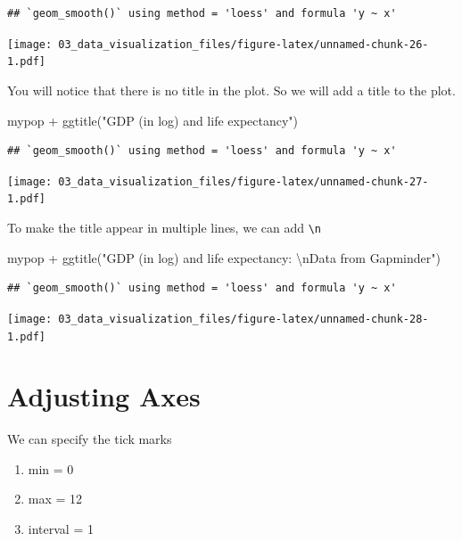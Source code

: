 \documentclass[
  10pt,
]{krantz}
\newenvironment{Shaded}{\begin{snugshade}}{\end{snugshade}}
\newcommand{\FunctionTok}[1]{\textcolor[rgb]{0.00,0.00,0.00}{#1}}
\newcommand{\NormalTok}[1]{#1}
\newcommand{\SpecialCharTok}[1]{\textcolor[rgb]{0.00,0.00,0.00}{#1}}
\newcommand{\StringTok}[1]{\textcolor[rgb]{0.31,0.60,0.02}{#1}}
\providecommand{\tightlist}{%
  \setlength{\itemsep}{0pt}\setlength{\parskip}{0pt}}
\begin{document}
\begin{verbatim}
## `geom_smooth()` using method = 'loess' and formula 'y ~ x'
\end{verbatim}

\texttt{[image: 03\_data\_visualization\_files/figure-latex/unnamed-chunk-26-1.pdf]}

You will notice that there is no title in the plot. So we will add a title to the plot.

\begin{Shaded}
\begin{Highlighting}[]
\NormalTok{mypop }\SpecialCharTok{+} 
  \FunctionTok{ggtitle}\NormalTok{(}\StringTok{"GDP (in log) and life expectancy"}\NormalTok{)}
\end{Highlighting}
\end{Shaded}

\begin{verbatim}
## `geom_smooth()` using method = 'loess' and formula 'y ~ x'
\end{verbatim}

\texttt{[image: 03\_data\_visualization\_files/figure-latex/unnamed-chunk-27-1.pdf]}

To make the title appear in multiple lines, we can add \texttt{\textbackslash{}n}

\begin{Shaded}
\begin{Highlighting}[]
\NormalTok{mypop }\SpecialCharTok{+} \FunctionTok{ggtitle}\NormalTok{(}\StringTok{"GDP (in log) and life expectancy:}
\StringTok{                }\SpecialCharTok{\textbackslash{}n}\StringTok{Data from Gapminder"}\NormalTok{)}
\end{Highlighting}
\end{Shaded}

\begin{verbatim}
## `geom_smooth()` using method = 'loess' and formula 'y ~ x'
\end{verbatim}

\texttt{[image: 03\_data\_visualization\_files/figure-latex/unnamed-chunk-28-1.pdf]}

\hypertarget{adjusting-axes}{%
\section{Adjusting Axes}\label{adjusting-axes}}

We can specify the tick marks

\begin{enumerate}
\def\labelenumi{\arabic{enumi}.}
\tightlist
\item
  min = 0
\item
  max = 12
\item
  interval = 1
\end{enumerate}
\end{document}
